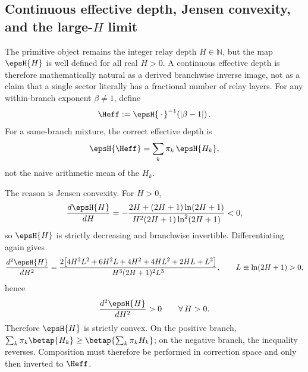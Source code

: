 \subsection{Continuous effective depth, Jensen convexity, and the large-\(H\) limit}\label{subsec:continuous_Heff}

The primitive object remains the integer relay depth \(H\in\mathbb{N}\),
but the map \(\epsH{H}\) is well defined for all real \(H>0\).
A continuous effective depth is therefore mathematically natural as a derived
branchwise inverse image, not as a claim that a single sector literally
has a fractional number of relay layers.
For any within-branch exponent \(\beta\neq 1\), define
\begin{equation}
\Heff:=\epsH{\,\cdot\,}^{-1}\!\left(\left|\beta-1\right|\right).
\label{eq:Heff}
\end{equation}
For a same-branch mixture, the correct effective depth is
\begin{equation}
\epsH{\Heff}=\sum_k \pi_k\,\epsH{H_k},
\label{eq:Heffmix}
\end{equation}
not the naive arithmetic mean of the \(H_k\).

The reason is Jensen convexity.
For \(H>0\),
\begin{equation}
\frac{d\epsH{H}}{dH}=
-\frac{2H+(2H+1)\ln(2H+1)}
 {H^{2}(2H+1)\ln^{2}(2H+1)}<0,
\label{eq:epsprime}
\end{equation}
so \(\epsH{H}\) is strictly decreasing and branchwise invertible.
Differentiating again gives
\begin{equation}
\frac{d^{2}\epsH{H}}{dH^{2}}=
\frac{2\!\left[4H^{2}L^{2}+6H^{2}L+4H^{2}+4HL^{2}+2HL+L^{2}\right]}
 {H^{3}(2H+1)^{2}L^{3}},\qquad L\equiv \ln(2H+1)>0,
\label{eq:epssecond}
\end{equation}
hence
\begin{equation}
\frac{d^{2}\epsH{H}}{dH^{2}}>0 \qquad \forall\,H>0.
\label{eq:jensen_prop}
\end{equation}
Therefore \(\epsH{H}\) is strictly convex.
On the positive branch,
\(\sum_k \pi_k\betap{H_k}\ge \betap{\sum_k \pi_kH_k}\);
on the negative branch, the inequality reverses.
Composition must therefore be performed in correction space and only then
inverted to \(\Heff\).

